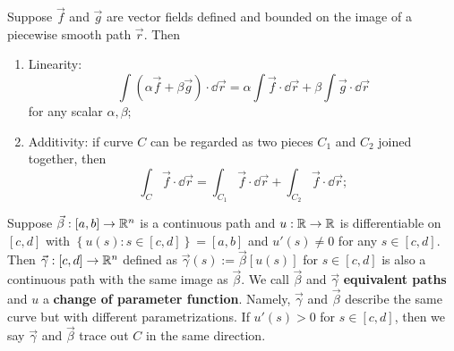 \documentclass[a4paper]{ctexart}
\begin{document}
    \begin{mythm}
        Suppose $\vec f$ and $\vec g$ are vector fields defined and bounded on the image of a piecewise smooth path $\vec r$. Then
        \begin{enumerate}[label=(\arabic*)]
            \item Linearity: $$ \int (\alpha \vec f + \beta \vec g) \cdot \dd \vec r = \alpha \int \vec f \cdot \dd \vec r + \beta \int \vec g \cdot \dd \vec r$$ for any scalar $\alpha, \beta$;
            \item Additivity: if curve $C$ can be regarded as two pieces $C_1$ and $C_2$ joined together, then $$ \int_C \vec f \cdot \dd \vec r = \int_{C_1} \vec f \cdot \dd \vec r + \int_{C_2} \vec f \cdot \dd \vec r; $$
        \end{enumerate}
    \end{mythm}
    \begin{mydef}
        Suppose $\vec \beta:[a,b] \to \mathbb{R}^n$ is a continuous path and $u:\mathbb{R} \to \mathbb{R}$ is differentiable on $[c,d]$ with $\left\{ u(s) : s\in [c,d] \right\} = [a,b]$ and $u'(s) \ne 0$ for any $s\in [c,d]$. Then $\vec \gamma: [c,d] \to \mathbb{R}^n$ defined as $\vec \gamma(s) := \vec \beta [u(s)]$ for $s\in [c,d]$ is also a continuous path with the same image as $\vec \beta$. We call $\vec \beta$ and $\vec \gamma$ \textbf{equivalent paths} and $u$ a \textbf{change of parameter function}. Namely, $\vec \gamma$ and $\vec \beta$ describe the same curve but with different parametrizations. If $u'(s) >0$ for $s\in [c,d]$, then we say $\vec \gamma$ and $\vec \beta$ trace out $C$ in the same direction.
    \end{mydef}
\end{document}
